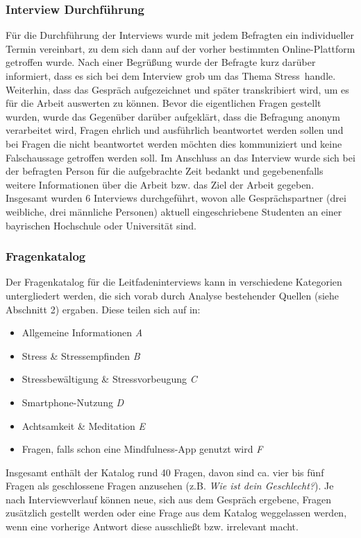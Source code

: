 \documentclass[10pt]{article}
\begin{document}
\subsubsection{Interview Durchführung}
Für die Durchführung der Interviews wurde mit jedem Befragten ein individueller Termin vereinbart, zu dem sich dann auf der vorher bestimmten Online-Plattform getroffen wurde. Nach einer Begrüßung wurde der Befragte kurz darüber informiert, dass es sich bei dem Interview grob um das Thema  \grqq Stress\grqq\ handle. Weiterhin, dass das Gespräch aufgezeichnet und später transkribiert wird, um es für die Arbeit auswerten zu können. Bevor die eigentlichen Fragen gestellt wurden, wurde das Gegenüber darüber aufgeklärt, dass die Befragung anonym verarbeitet wird, Fragen ehrlich und ausführlich beantwortet werden sollen und bei Fragen die nicht beantwortet werden möchten dies kommuniziert und keine Falschaussage getroffen werden soll. Im Anschluss an das Interview wurde sich bei der befragten Person für die aufgebrachte Zeit bedankt und gegebenenfalls weitere Informationen über die Arbeit bzw. das Ziel der Arbeit gegeben.
Insgesamt wurden 6 Interviews durchgeführt, wovon alle Gesprächspartner (drei weibliche, drei männliche Personen) aktuell eingeschriebene Studenten an einer bayrischen Hochschule oder Universität sind. 

\subsubsection{Fragenkatalog}
Der Fragenkatalog für die Leitfadeninterviews kann in verschiedene Kategorien untergliedert werden, die sich vorab durch Analyse bestehender Quellen (siehe Abschnitt 2) ergaben. Diese teilen sich auf in: 
\begin{itemize}[itemsep=0.5mm, parsep=0pt]
\item  Allgemeine Informationen \textit{A}
\item  Stress \& Stressempfinden \textit{B}
\item  Stressbewältigung \& Stressvorbeugung \textit{C}
\item  Smartphone-Nutzung \textit{D}
\item  Achtsamkeit \& Meditation \textit{E}
\item  Fragen, falls schon eine Mindfulness-App genutzt wird \textit{F}
\end{itemize}

Insgesamt enthält der Katalog rund 40 Fragen, davon sind ca. vier bis fünf Fragen als geschlossene Fragen anzusehen (z.B. \textit{Wie ist dein Geschlecht?}). Je nach Interviewverlauf können neue, sich aus dem Gespräch ergebene, Fragen zusätzlich gestellt werden oder eine Frage aus dem Katalog weggelassen werden, wenn eine vorherige Antwort diese ausschließt bzw. irrelevant macht.
\end{document}
